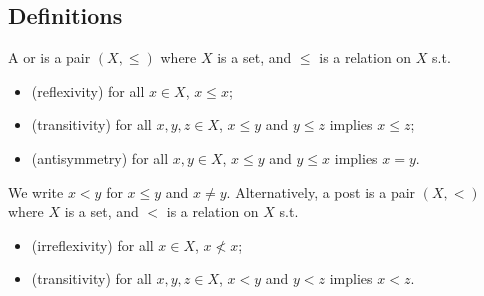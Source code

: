 \subsection{Definitions}
\begin{definition}
    A  or  is a pair $(X, \leq)$ where $X$ is a set, and $\leq$ is a relation on $X$ s.t.
    \begin{itemize}
        \item (reflexivity) for all $x \in X$, $x \leq x$;
        \item (transitivity) for all $x, y, z \in X$, $x \leq y$ and $y \leq z$ implies $x \leq z$;
        \item (antisymmetry) for all $x, y \in X$, $x \leq y$ and $y \leq x$ implies $x = y$.
    \end{itemize}
\end{definition}
We write $x < y$ for $x \leq y$ and $x \neq y$.
Alternatively, a post is a pair $(X, <)$ where $X$ is a set, and $<$ is a relation on $X$ s.t.
\begin{itemize}
    \item (irreflexivity) for all $x \in X$, $x \not < x$;
    \item (transitivity) for all $x, y, z \in X$, $x < y$ and $y < z$ implies $x < z$.
\end{itemize}
